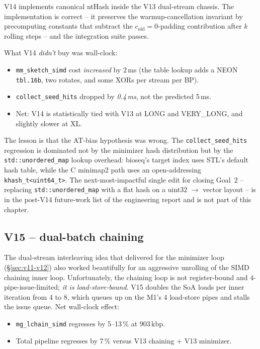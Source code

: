 V14 implements canonical ntHash inside the V13 dual-stream chassis.
The implementation is correct -- it preserves the warmup-cancellation
invariant by precomputing constants that subtract the
$c_\text{old} = 0$-padding contribution after $k$ rolling steps --
and the integration suite passes.

What V14 \emph{didn't} buy was wall-clock:

\begin{itemize}
\item \texttt{mm\_sketch\_simd} cost \emph{increased} by 2\,ms
  (the table lookup adds a NEON \texttt{tbl.16b}, two rotates, and
  some XORs per stream per BP).
\item \texttt{collect\_seed\_hits} dropped by \emph{0.4\,ms}, not
  the predicted 5\,ms.
\item Net: V14 is statistically tied with V13 at LONG and
  VERY\_LONG, and slightly slower at XL.
\end{itemize}

The lesson is that the AT-bias hypothesis was wrong.  The
\texttt{collect\_seed\_hits} regression is dominated not by the
minimizer hash distribution but by the \texttt{std::unordered\_map}
lookup overhead: bioseq's target index uses STL's default hash
table, while the C minimap2 path uses an open-addressing
\texttt{khash\_t<uint64\_t>}.  The next-most-impactful single edit
for closing Goal~2 -- replacing \texttt{std::unordered\_map} with a
flat hash on a uint32 $\to$ vector layout -- is in the post-V14
future-work list of the engineering report and is not part of this
chapter.

\subsection{V15 -- dual-batch chaining}
\label{sec:v15-chain-v2}

The dual-stream interleaving idea that delivered for the minimizer
loop (\S\ref{sec:v11-v12}) also worked beautifully for an aggressive
unrolling of the SIMD chaining inner loop. Unfortunately, the
chaining loop is not register-bound and 4-pipe-issue-limited;
\emph{it is load-store-bound}.  V15 doubles the SoA loads per inner
iteration from 4 to 8, which queues up on the M1's 4 load-store
pipes and stalls the issue queue.  Net wall-clock effect:

\begin{itemize}
\item \texttt{mg\_lchain\_simd} regresses by 5--13\,\% at 903\,kbp.
\item Total pipeline regresses by 7\,\% versus V13 chaining + V13 minimizer.
\end{itemize}

